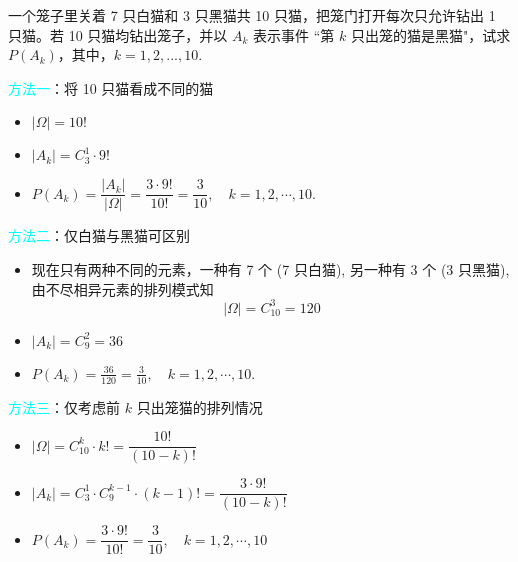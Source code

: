 	\begin{frame}%
		\begin{exam}
			\label{exam1.2}
			一个笼子里关着 7 只白猫和 3 只黑猫共 10 只猫，把笼门打开每次只允许钻出 1 只猫。若 10 只猫均钻出笼子，并以 $A_k$ 表示事件 ``第 $k$ 只出笼的猫是黑猫"，试求 $P (A_k)$，其中，$k=1,2,...,10$.
		\end{exam}


	\end{frame}
	\begin{frame}
		\textcolor{cyan}{方法一}：将 10 只猫看成不同的猫
		\begin{itemize}[<+-|alert@+>]
			\item  $|\Omega|=10!$
			\item  $\left|A_{k}\right|=C_3^1 \cdot 9!$
			\item $
			P\left(A_{k}\right)=\dfrac{\left|A_{k}\right|}{|\Omega|}=\dfrac{3 \cdot 9 !}{10 !}=\dfrac{3}{10}, \quad k=1,2, \cdots, 10 .	$
		\end{itemize}



	\end{frame}


	\begin{frame}%
		\textcolor{cyan}{方法二}：仅白猫与黑猫可区别
		\begin{itemize}[<+-|alert@+>]
			\item 现在只有两种不同的元素，一种有 7 个 (7 只白猫), 另一种有 3 个 (3 只黑猫), 由不尽相异元素的排列模式知
			$$|\Omega|=C_{10}^3=120$$
			\item  $\left|A_{k}\right|=C_9^2=36$

			\item $
			P\left(A_{k}\right)=\frac{36}{120}=\frac{3}{10}, \quad k=1,2, \cdots, 10 .
			$
		\end{itemize}

	\end{frame}
	\begin{frame}%
		\textcolor{cyan}{方法三}：仅考虑前 $k$ 只出笼猫的排列情况 %
		\begin{itemize}[<+-|alert@+>]
			\item $|\Omega|=C_{10}^k\cdot k!=\dfrac{10!}{(10-k) !}$
			\item $\left|A_{k}\right|=C_{3}^1\cdot C_{9}^{k-1}\cdot (k-1)!=\dfrac{3 \cdot 9!}{(10-k) !}$
			\item  $
			P\left(A_{k}\right)=\dfrac{3 \cdot 9 !}{10 !}=\dfrac{3}{10}, \quad k=1,2, \cdots, 10
			$
		\end{itemize}

	\end{frame}

